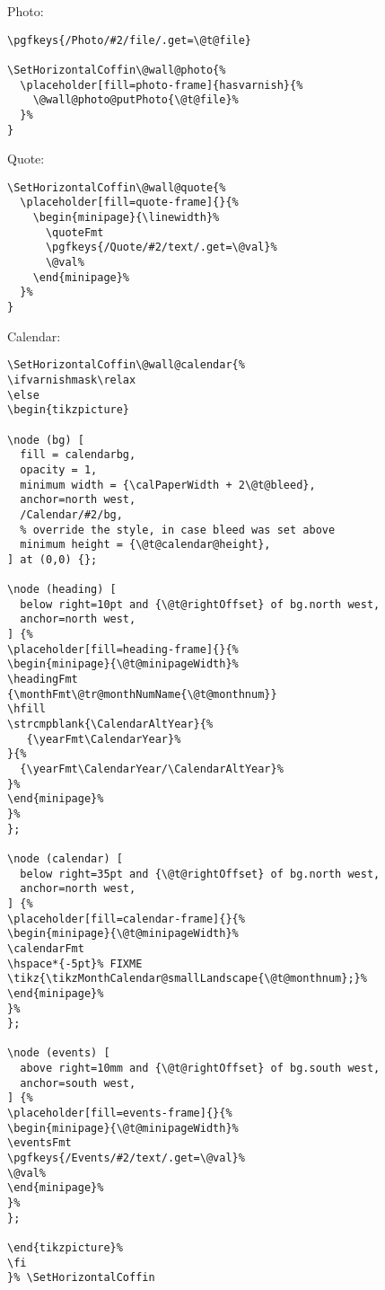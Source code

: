 \documentclass[11pt,oneside]{memoir-article}
\begin{document}
Photo:

\begin{verbatim}
\pgfkeys{/Photo/#2/file/.get=\@t@file}

\SetHorizontalCoffin\@wall@photo{%
  \placeholder[fill=photo-frame]{hasvarnish}{%
    \@wall@photo@putPhoto{\@t@file}%
  }%
}
\end{verbatim}

Quote:

\begin{verbatim}
\SetHorizontalCoffin\@wall@quote{%
  \placeholder[fill=quote-frame]{}{%
    \begin{minipage}{\linewidth}%
      \quoteFmt
      \pgfkeys{/Quote/#2/text/.get=\@val}%
      \@val%
    \end{minipage}%
  }%
}
\end{verbatim}

Calendar:

\begin{verbatim}
\SetHorizontalCoffin\@wall@calendar{%
\ifvarnishmask\relax
\else
\begin{tikzpicture}

\node (bg) [
  fill = calendarbg,
  opacity = 1,
  minimum width = {\calPaperWidth + 2\@t@bleed},
  anchor=north west,
  /Calendar/#2/bg,
  % override the style, in case bleed was set above
  minimum height = {\@t@calendar@height},
] at (0,0) {};

\node (heading) [
  below right=10pt and {\@t@rightOffset} of bg.north west,
  anchor=north west,
] {%
\placeholder[fill=heading-frame]{}{%
\begin{minipage}{\@t@minipageWidth}%
\headingFmt
{\monthFmt\@tr@monthNumName{\@t@monthnum}}
\hfill
\strcmpblank{\CalendarAltYear}{%
   {\yearFmt\CalendarYear}%
}{%
  {\yearFmt\CalendarYear/\CalendarAltYear}%
}%
\end{minipage}%
}%
};

\node (calendar) [
  below right=35pt and {\@t@rightOffset} of bg.north west,
  anchor=north west,
] {%
\placeholder[fill=calendar-frame]{}{%
\begin{minipage}{\@t@minipageWidth}%
\calendarFmt
\hspace*{-5pt}% FIXME
\tikz{\tikzMonthCalendar@smallLandscape{\@t@monthnum};}%
\end{minipage}%
}%
};

\node (events) [
  above right=10mm and {\@t@rightOffset} of bg.south west,
  anchor=south west,
] {%
\placeholder[fill=events-frame]{}{%
\begin{minipage}{\@t@minipageWidth}%
\eventsFmt
\pgfkeys{/Events/#2/text/.get=\@val}%
\@val%
\end{minipage}%
}%
};

\end{tikzpicture}%
\fi
}% \SetHorizontalCoffin
\end{verbatim}
\end{document}
